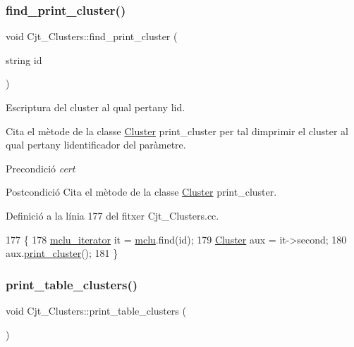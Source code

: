 \subsubsection{\texorpdfstring{find\+\_\+print\+\_\+cluster()}{find\_print\_cluster()}}
{\footnotesize\ttfamily void Cjt\+\_\+\+Clusters\+::find\+\_\+print\+\_\+cluster (\begin{DoxyParamCaption}\item[{string}]{id }\end{DoxyParamCaption})}



Escriptura del cluster al qual pertany l\textquotesingle{}id. 

Cita el mètode de la classe \hyperlink{class_cluster}{Cluster} print\+\_\+cluster per tal d\textquotesingle{}imprimir el cluster al qual pertany l\textquotesingle{}identificador del paràmetre.

\begin{DoxyPrecond}{Precondició}
{\itshape cert} 
\end{DoxyPrecond}
\begin{DoxyPostcond}{Postcondició}
Cita el mètode de la classe \hyperlink{class_cluster}{Cluster} print\+\_\+cluster. 
\end{DoxyPostcond}


Definició a la línia 177 del fitxer Cjt\+\_\+\+Clusters.\+cc.


\begin{DoxyCode}
177                                                \{
178     \hyperlink{class_cjt___clusters_ad9cf46a8e1e6430c7b34b184f2756054}{mclu\_iterator} it = \hyperlink{class_cjt___clusters_a5f5e13255bca1fac2ad65c51473f6ead}{mclu}.find(\textcolor{keywordtype}{id});
179     \hyperlink{class_cluster}{Cluster} aux = it->second;
180     aux.\hyperlink{class_cluster_ad4607d22299a7b2b2cc271300166da47}{print\_cluster}();
181 \}
\end{DoxyCode}
\mbox{\label{class_cjt___clusters_acc4dd33e82c36c394acd44e60f77da22}} 
\subsubsection{\texorpdfstring{print\+\_\+table\+\_\+clusters()}{print\_table\_clusters()}}
{\footnotesize\ttfamily void Cjt\+\_\+\+Clusters\+::print\+\_\+table\+\_\+clusters (\begin{DoxyParamCaption}{ }\end{DoxyParamCaption})}



